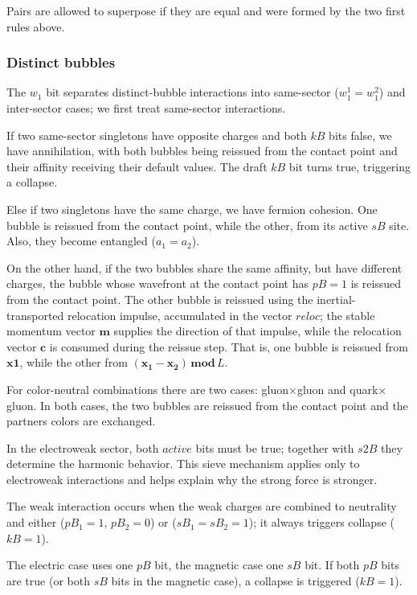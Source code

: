 \documentclass{ijuc}
\begin{document}
Pairs are allowed to superpose if they are equal and were formed by the two first rules above.

\subsubsection{Distinct bubbles} \label{subsec:distinct}
The $w_1$ bit separates distinct-bubble interactions into same-sector ($w_1^1=w_1^2$) and inter-sector cases; we first treat same-sector interactions.

If two same-sector singletons have opposite charges and both $kB$ bits false, we have annihilation, with both bubbles being reissued from the contact point and their affinity receiving their default values. The draft $kB$ bit turns true, triggering a collapse.

Else if two singletons have the same charge, we have fermion cohesion. 
One bubble is reissued from the contact point, while the other, from its active $sB$ site. 
Also, they become entangled ($a_1=a_2$).

On the other hand, if the two bubbles share the same affinity, but have different charges, the bubble whose wavefront at the contact point has $pB=1$ is reissued from the contact point.
The other bubble is reissued using the inertial-transported relocation impulse, accumulated in the vector $\boldsymbol{\mathit{reloc}}$; the stable momentum vector $\boldsymbol{m}$ supplies the direction of that impulse, while the relocation vector $\boldsymbol{c}$ is consumed during the reissue step.
That is, one bubble is reissued from $\boldsymbol{x1}$, while the other from $(\boldsymbol{x_1}-\boldsymbol{x_2})\,\boldsymbol{mod}\,L$.

For color-neutral combinations there are two cases: gluon$\times$gluon and quark$\times$gluon. 
In both cases, the two bubbles are reissued from the contact point and the partners colors are exchanged.

In the electroweak sector, both $\mathit{active}$ bits must be true; together with $s2B$ they determine the harmonic behavior. This sieve mechanism applies only to electroweak interactions and helps explain why the strong force is stronger.

The weak interaction occurs when the weak charges are combined to neutrality and either ($pB_1=1$, $pB_2=0$) or ($sB_1=sB_2=1$); it always triggers collapse ($kB=1$).

The electric case uses one $pB$ bit, the magnetic case one $sB$ bit. If both $pB$ bits are true (or both $sB$ bits in the magnetic case), a collapse is triggered ($kB=1$).
\end{document}
